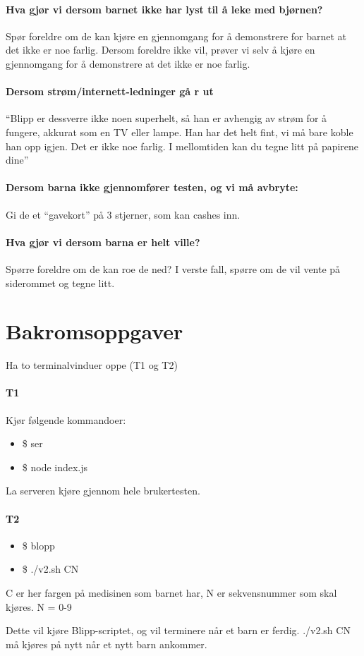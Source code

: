 \paragraph{Hva gj\o r vi dersom barnet ikke har lyst til \r{a}  leke med bj\o rnen?}
Sp\o r foreldre om de kan kj\o re en gjennomgang for \r{a}  demonstrere for barnet at det ikke er noe farlig. 
Dersom foreldre ikke vil, pr\o ver vi selv \r{a}  kj\o re en gjennomgang for \r{a}  demonstrere at det ikke er noe farlig. 
 
\paragraph{Dersom str\o m/internett-ledninger g\r{a} r ut}
``Blipp er dessverre ikke noen superhelt, s\r{a}  han er avhengig av str\o m for \r{a}  fungere, akkurat som en TV eller lampe. Han har det helt fint, vi m\r{a}  bare koble han opp igjen. Det er ikke noe farlig. I mellomtiden kan du tegne litt p\r{a}  papirene dine''

\paragraph{Dersom barna ikke gjennomf\o rer testen, og vi m\r{a}  avbryte:}
Gi de et ``gavekort'' p\r{a}  3 stjerner, som kan cashes inn. 

\paragraph{Hva gj\o r vi dersom barna er helt ville?}
Sp\o rre foreldre om de kan roe de ned? I verste fall, sp\o rre om de vil vente p\r{a}  siderommet og tegne litt.

\section{Bakromsoppgaver}
Ha to terminalvinduer oppe (T1 og T2)

\paragraph{T1}
Kj\o r f\o lgende kommandoer:
\begin{itemize}
  \item \$ ser
  \item \$ node index.js  
\end{itemize}
La serveren kj\o re gjennom hele brukertesten.
\paragraph{T2}
\begin{itemize}
  \item \$ blopp
  \item \$ ./v2.sh CN  
\end{itemize}
C er her fargen p\r{a} medisinen som barnet har, N er sekvensnummer som skal kj\o res. N = {0-9}

Dette vil kj\o re Blipp-scriptet, og vil terminere n\r{a}r et barn er ferdig. ./v2.sh CN m\r{a} kj\o res p\r{a} nytt n\r{a}r et nytt barn ankommer. 

  
